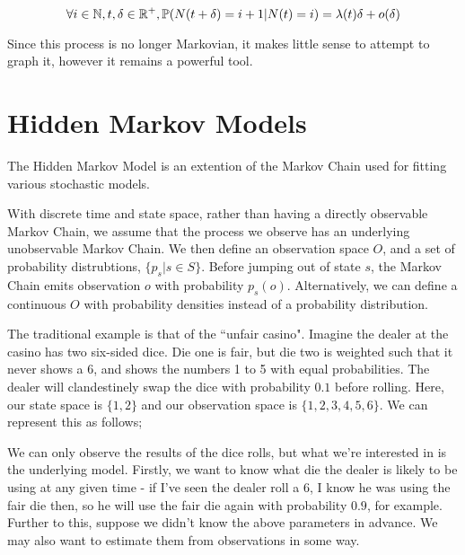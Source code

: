 $$
\forall i \in \mathbb{N}, t,\delta \in \mathbb{R}^{+}, \mathbb{P} (N(t+\delta) = i+1 | N(t) = i) = \lambda(t) \delta + o(\delta)
$$

Since this process is no longer Markovian, it makes little sense to attempt to graph it, however it remains a powerful tool.

\section{Hidden Markov Models}

The Hidden Markov Model is an extention of the Markov Chain used for fitting various stochastic models.

With discrete time and state space, rather than having a directly observable Markov Chain, we assume that the process we observe has an underlying unobservable Markov Chain. We then define an observation space $O$, and a set of probability distrubtions, $\{p_s | s \in S\}$. Before jumping out of state $s$, the Markov Chain emits observation $o$ with probability $p_s(o)$. Alternatively, we can define a continuous $O$ with probability densities instead of a probability distribution.

The traditional example is that of the ``unfair casino". Imagine the dealer at the casino has two six-sided dice. Die one is fair, but die two is weighted such that it never shows a $6$, and shows the numbers 1 to 5 with equal probabilities. The dealer will clandestinely swap the dice with probability $0.1$ before rolling. Here, our state space is $\{1,2\}$ and our observation space is $\{1,2,3,4,5,6\}$. We can represent this as follows;

We can only observe the results of the dice rolls, but what we're interested in is the underlying model. Firstly, we want to know what die the dealer is likely to be using at any given time - if I've seen the dealer roll a 6, I know he was using the fair die then, so he will use the fair die again with probability $0.9$, for example. Further to this, suppose we didn't know the above parameters in advance. We may also want to estimate them from observations in some way.